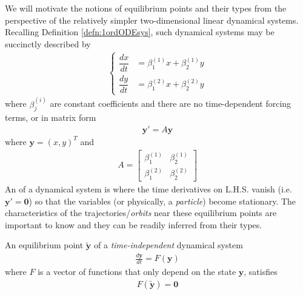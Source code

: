 We will motivate the notions of equilibrium points and their types from the perspective of the relatively simpler two-dimensional linear dynamical systems. Recalling Definition \ref{defn:1ordODEsys}, such dynamical systems may be succinctly described by
\begin{align}
\begin{cases}
\dfrac{dx}{dt} &= \beta_1^{(1)} x + \beta_2^{(1)} y \\[10pt]
\dfrac{dy}{dt} &= \beta_1^{(2)} x + \beta_2^{(2)} y   
\end{cases}
\label{eqn:2ddynexplicit}
\end{align}
where $\beta_j^{(i)}$ are constant coefficients and there are no time-dependent forcing terms, or in matrix form
\begin{align}
\textbf{y}' = A\textbf{y} \label{eqn:17.2}
\end{align}
where $\textbf{y} = (x,y)^T$ and
\begin{align}
A = 
\begin{bmatrix}
\beta_1^{(1)} & \beta_2^{(1)} \\
\beta_1^{(2)} & \beta_2^{(2)} 
\end{bmatrix}
\label{eqn:2ddynexplicit2}
\end{align}
An  of a dynamical system is where the time derivatives on L.H.S. vanish (i.e.\ $\textbf{y}' = \textbf{0}$) so that the variables (or physically, a \textit{particle}) become stationary. The characteristics of the trajectories/\textit{orbits} near these equilibrium points are important to know and they can be readily inferred from their types.
\begin{defn}
\label{defn:eqpts}
An equilibrium point $\tilde{\textbf{y}}$ of a \textit{time-independent} dynamical system
\begin{align}
\frac{d\textbf{y}}{dt} = F(\textbf{y}) \label{eqn:eqpts1}
\end{align}
where $F$ is a vector of functions that only depend on the state $\textbf{y}$, satisfies
\begin{align}
F(\tilde{\textbf{y}}) = \textbf{0} \label{eqn:eqpts2}
\end{align}
\end{defn}

